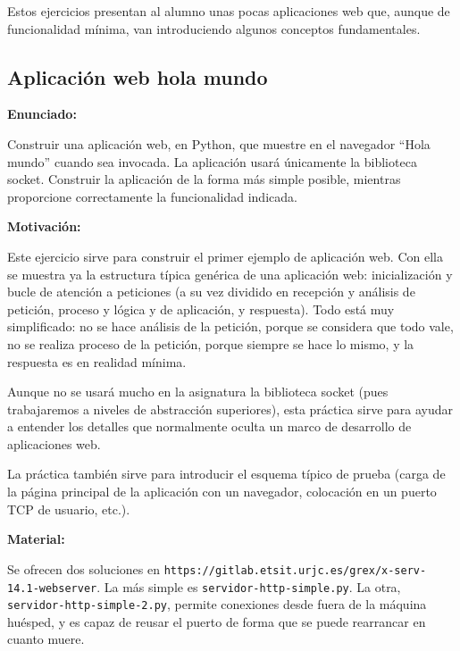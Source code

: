 Estos ejercicios presentan al alumno unas pocas aplicaciones web que, aunque de funcionalidad mínima, van introduciendo algunos conceptos fundamentales.

\subsection{Aplicación web hola mundo}
\label{subsec:aplweb-hola-mundo}

\textbf{Enunciado:}

Construir una aplicación web, en Python, que muestre en el navegador ``Hola mundo'' cuando sea invocada. La aplicación usará únicamente la biblioteca socket. Construir la aplicación de la forma más simple posible, mientras proporcione correctamente la funcionalidad indicada.

\textbf{Motivación:}

Este ejercicio sirve para construir el primer ejemplo de aplicación web. Con ella se muestra ya la estructura típica genérica de una aplicación web: inicialización y bucle de atención a peticiones (a su vez dividido en recepción y análisis de petición, proceso y lógica y de aplicación, y respuesta). Todo está muy simplificado: no se hace análisis de la petición, porque se considera que todo vale, no se realiza proceso de la petición, porque siempre se hace lo mismo, y la respuesta es en realidad mínima.

Aunque no se usará mucho en la asignatura la biblioteca socket (pues trabajaremos a niveles de abstracción superiores), esta práctica sirve para ayudar a entender los detalles que normalmente oculta un marco de desarrollo de aplicaciones web.

La práctica también sirve para introducir el esquema típico de prueba (carga de la página principal de la aplicación con un navegador, colocación en un puerto TCP de usuario, etc.).

\textbf{Material:}

Se ofrecen dos soluciones en \verb|https://gitlab.etsit.urjc.es/grex/x-serv-14.1-webserver|. La más simple es \verb|servidor-http-simple.py|. La otra, \verb|servidor-http-simple-2.py|, permite conexiones desde fuera de la máquina huésped, y es capaz de reusar el puerto de forma que se puede rearrancar en cuanto muere.


